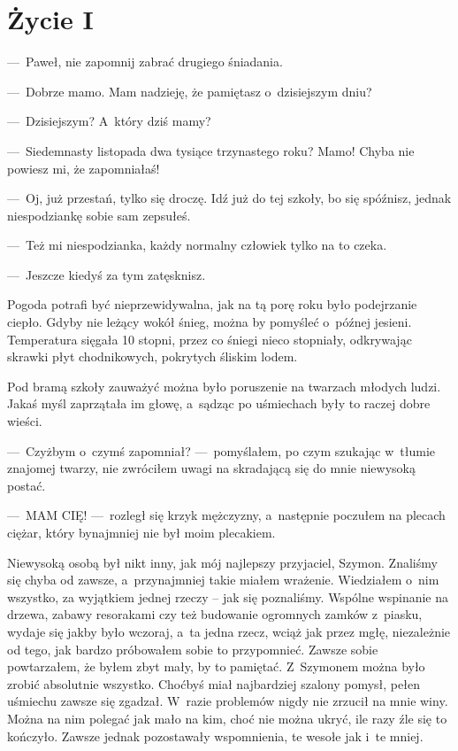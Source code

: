 \chapter{Życie I}

---~Paweł, nie zapomnij zabrać drugiego śniadania.

---~Dobrze mamo. Mam nadzieję, że pamiętasz o~dzisiejszym dniu?

---~Dzisiejszym? A~który dziś mamy?

---~Siedemnasty listopada dwa tysiące trzynastego roku? Mamo! Chyba nie powiesz mi, że zapomniałaś!

---~Oj, już przestań, tylko się droczę. Idź już do tej szkoły, bo się spóźnisz, jednak niespodziankę sobie sam 
zepsułeś.

---~Też mi niespodzianka, każdy normalny człowiek tylko na to czeka.

---~Jeszcze kiedyś za tym zatęsknisz.

\paraSep

Pogoda potrafi być nieprzewidywalna, jak na tą porę roku było podejrzanie ciepło. Gdyby nie leżący wokół śnieg, można 
by pomyśleć o~późnej jesieni. Temperatura sięgała 10 stopni, przez co śniegi nieco stopniały, odkrywając skrawki płyt 
chodnikowych, pokrytych śliskim lodem.

Pod bramą szkoły zauważyć można było poruszenie na twarzach młodych ludzi. Jakaś myśl zaprzątała im głowę, a~sądząc 
po uśmiechach były to raczej dobre wieści. 

---~Czyżbym o~czymś zapomniał? ---~pomyślałem, po czym szukając w~tłumie znajomej twarzy, nie zwróciłem uwagi na 
skradającą się do mnie niewysoką postać.

---~MAM CIĘ! ---~rozległ się krzyk mężczyzny, a~następnie poczułem na plecach ciężar, który bynajmniej nie był moim 
plecakiem.

Niewysoką osobą był nikt inny, jak mój najlepszy przyjaciel, Szymon. Znaliśmy się chyba od zawsze, a~przynajmniej 
takie miałem wrażenie. Wiedziałem o~nim wszystko, za wyjątkiem jednej rzeczy -- jak się poznaliśmy. Wspólne wspinanie 
na drzewa, zabawy resorakami czy też budowanie ogromnych zamków z~piasku, wydaje się jakby było wczoraj, a~ta jedna 
rzecz, wciąż jak przez mgłę, niezależnie od tego, jak bardzo próbowałem sobie to przypomnieć. Zawsze sobie 
powtarzałem, że byłem zbyt mały, by to pamiętać. Z~Szymonem można było zrobić absolutnie wszystko. Choćbyś miał 
najbardziej szalony pomysł, pełen uśmiechu zawsze się zgadzał. W~razie problemów nigdy nie zrzucił na mnie winy. 
Można na nim polegać jak mało na kim, choć nie można ukryć, ile razy źle się to kończyło. Zawsze jednak pozostawały 
wspomnienia, te wesołe jak i~te mniej.

